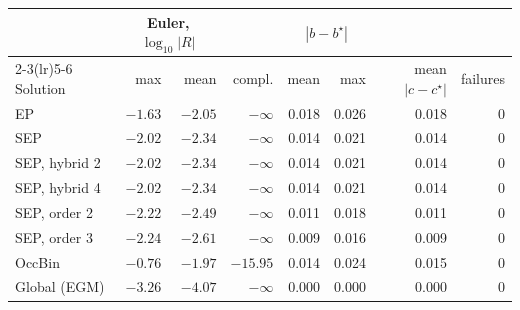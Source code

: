 \begin{tabular}{lrrrrrrr}
\toprule
& \multicolumn{2}{c}{Euler, $\log_{10}|R|$} & & \multicolumn{2}{c}{$|b-b^\star|$} & & \\ \cmidrule(lr){2-3}\cmidrule(lr){5-6} Solution & max & mean & compl. & mean & max & mean $|c-c^\star|$ & failures \\
\midrule
EP & $-1.63$ & $-2.05$ & $-\infty$ & 0.018 & 0.026 & 0.018 & 0 \\
SEP & $-2.02$ & $-2.34$ & $-\infty$ & 0.014 & 0.021 & 0.014 & 0 \\
SEP, hybrid 2 & $-2.02$ & $-2.34$ & $-\infty$ & 0.014 & 0.021 & 0.014 & 0 \\
SEP, hybrid 4 & $-2.02$ & $-2.34$ & $-\infty$ & 0.014 & 0.021 & 0.014 & 0 \\
SEP, order 2 & $-2.22$ & $-2.49$ & $-\infty$ & 0.011 & 0.018 & 0.011 & 0 \\
SEP, order 3 & $-2.24$ & $-2.61$ & $-\infty$ & 0.009 & 0.016 & 0.009 & 0 \\
OccBin & $-0.76$ & $-1.97$ & $-15.95$ & 0.014 & 0.024 & 0.015 & 0 \\
Global (EGM) & $-3.26$ & $-4.07$ & $-\infty$ & 0.000 & 0.000 & 0.000 & 0 \\
\bottomrule
\end{tabular}
